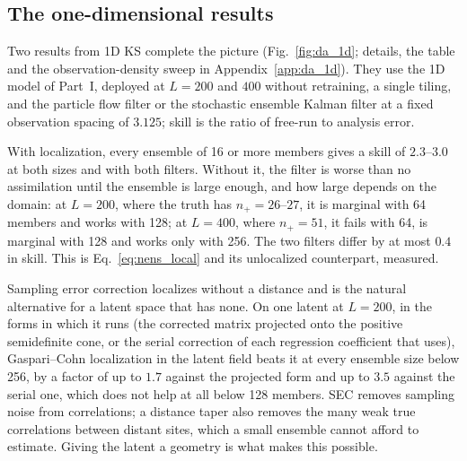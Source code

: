 \subsection{The one-dimensional results}
\label{sec:da_1d}

Two results from 1D KS complete the picture (Fig.~\ref{fig:da_1d};
details, the table and the observation-density sweep in
Appendix~\ref{app:da_1d}). They use the 1D model of Part~I, deployed at
$L=200$ and $400$ without retraining, a single tiling, and the particle flow
filter or the stochastic ensemble Kalman filter at a fixed observation
spacing of $3.125$; skill is the ratio of free-run to analysis error.

With localization, every ensemble of 16 or more members gives a skill of
$2.3$--$3.0$ at both sizes and with both filters. Without it, the filter is
worse than no assimilation until the ensemble is large enough, and how
large depends on the domain: at $L=200$, where the truth has $n_+=26$--$27$, it is
marginal with 64 members and works with 128; at $L=400$, where $n_+=51$, it
fails with 64, is marginal with 128 and works only with 256. The two
filters differ by at most $0.4$ in skill. This is Eq.~\eqref{eq:nens_local}
and its unlocalized counterpart, measured.

 Sampling error
correction \citep{anderson2012} localizes without a distance and is the
natural alternative for a latent space that has none. On one latent at
$L=200$, in the forms in which it runs (the corrected matrix projected onto
the positive semidefinite cone, or the serial correction of each
regression coefficient that \citet{anderson2012} uses), Gaspari--Cohn
localization in the latent field beats it at every ensemble size below
256, by a factor of up to $1.7$ against the projected form and up to $3.5$
against the serial one, which does not help at all below 128 members.
SEC removes sampling noise from correlations; a distance taper also
removes the many weak true correlations between distant sites, which a
small ensemble cannot afford to estimate. Giving the latent a geometry is
what makes this possible.



